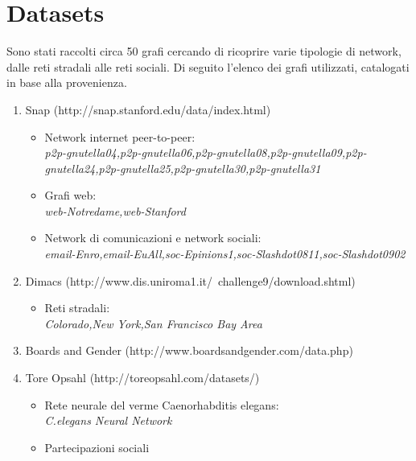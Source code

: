 \documentclass[twoside,openright,titlepage,fleqn,
	headinclude,11pt,a4paper,BCOR5mm,footinclude,pdftex
	]{scrbook}
\begin{document}
\section{Datasets}Sono stati raccolti circa 50 grafi cercando di ricoprire varie tipologie di network, dalle reti stradali alle reti sociali. Di seguito l'elenco dei grafi utilizzati, catalogati in base alla provenienza.
\begin{enumerate}
\item Snap (http://snap.stanford.edu/data/index.html)
\begin{itemize}
\item Network internet peer-to-peer:\\
\textit{p2p-gnutella04,p2p-gnutella06,p2p-gnutella08,p2p-gnutella09,p2p-gnutella24,p2p-gnutella25,p2p-gnutella30,p2p-gnutella31}
\item Grafi web:\\
\textit{ web-Notredame,web-Stanford  }
\item Network di comunicazioni e network sociali:\\
\textit{email-Enro,email-EuAll,soc-Epinions1,soc-Slashdot0811,soc-Slashdot0902}
\end{itemize}
\item Dimacs (http://www.dis.uniroma1.it/~challenge9/download.shtml)
\begin{itemize}
\item Reti stradali:\\
\textit{Colorado,New York,San Francisco Bay Area}
\end{itemize}
\item Boards and Gender (http://www.boardsandgender.com/data.php)
\item Tore Opsahl (http://toreopsahl.com/datasets/)
\begin{itemize}
\item Rete neurale del verme Caenorhabditis elegans:\\
\textit{C.elegans Neural Network}
\item Partecipazioni sociali\\

\end{itemize}
\end{enumerate}
\end{document}
